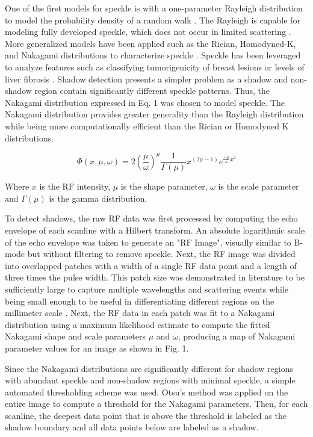 \documentclass[preprint,5p,authoryear]{elsarticle}
\begin{document}
One of the first models for speckle is with a one-parameter Rayleigh distribution to model the probability density of a random walk \citep{Burckhardt1978}. The Rayleigh is capable for modeling fully developed speckle, which does not occur in limited scattering \citep{Tuthill1988}. More generalized models have been applied such as the Rician, Homodyned-K, and Nakagami distributions to characterize speckle \citep{Destrempes2010}. Speckle has been leveraged to analyze features such as classifying tumorigenicity of breast lesions \citep{Byra2016} or levels of liver fibrosis \citep{Ho2012}. Shadow detection presents a simpler problem as a shadow and non-shadow region contain significantly different speckle patterns. Thus, the Nakagami distribution expressed in Eq. 1 was chosen to model speckle. The Nakagami distribution provides greater generality than the Rayleigh distribution while being more computationally efficient than the Rician or Homodyned K distributions.

\begin{equation}
\Phi(x,\mu,\omega) = 2(\frac{\mu}{\omega})^{\mu}\frac{1}{\Gamma(\mu)}x^{(2\mu-1)}e^{\frac{-\mu}{\omega}x^{2}}
\end{equation}

Where $x$ is the RF intensity, $\mu$ is the shape parameter, $\omega$ is the scale parameter and $\Gamma(\mu)$ is the gamma distribution.

To detect shadows, the raw RF data was first processed by computing the echo envelope of each scanline with a Hilbert transform. An absolute logarithmic scale of the echo envelope was taken to generate an "RF Image", visually similar to B-mode but without filtering to remove speckle. Next, the RF image was divided into overlapped patches with a width of a single RF data point and a length of three times the pulse width. This patch size was demonstrated in literature to be sufficiently large to capture multiple wavelengths and scattering events while being small enough to be useful in differentiating different regions on the millimeter scale \citep{Byra2016}. Next, the RF data in each patch was fit to a Nakagami distribution using a maximum likelihood estimate to compute the fitted Nakagami shape and scale parameters $\mu$ and $\omega$, producing a map of Nakagami parameter values for an image as shown in Fig. 1.

Since the Nakagami distributions are significantly different for shadow regions with abundant speckle and non-shadow regions with minimal speckle, a simple automated thresholding scheme was used. Otsu's method was applied on the entire image to compute a threshold for the Nakagami parameters. Then, for each scanline, the deepest data point that is above the threshold is labeled as the shadow boundary and all data points below are labeled as a shadow.
\end{document}
